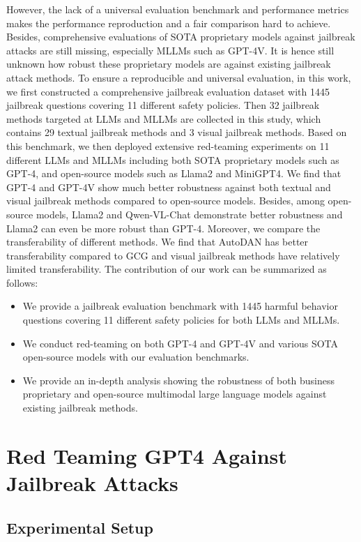 However, the lack of a universal evaluation benchmark and performance metrics makes the performance reproduction and a fair comparison hard to achieve. 
Besides, comprehensive evaluations of SOTA proprietary models against jailbreak attacks are still missing, especially MLLMs such as GPT-4V. 
It is hence still unknown how robust these proprietary models are against existing jailbreak attack methods. 
To ensure a reproducible and universal evaluation, in this work, we first constructed a comprehensive jailbreak evaluation dataset with 1445 jailbreak questions covering 11 different safety policies. Then 32 jailbreak methods targeted at LLMs and MLLMs are collected in this study, which contains 29 textual jailbreak methods and 3 visual jailbreak methods.
Based on this benchmark, we then deployed extensive red-teaming experiments on 11 different LLMs and MLLMs including both SOTA proprietary models such as GPT-4, and open-source models such as Llama2 and MiniGPT4. 
We find that GPT-4 and GPT-4V show much better robustness against both textual and visual jailbreak methods compared to open-source models. Besides, among open-source models, Llama2 and Qwen-VL-Chat demonstrate better robustness and Llama2 can even be more robust than GPT-4. Moreover, we compare the transferability of different methods. We find that AutoDAN has better transferability compared to GCG and visual jailbreak methods have relatively limited transferability. 
The contribution of our work can be summarized as follows: 
\begin{itemize}
    \item We provide a jailbreak evaluation benchmark with 1445 harmful behavior questions covering 11 different safety policies for both LLMs and MLLMs. 
    \item We conduct red-teaming on both GPT-4 and GPT-4V and various SOTA open-source models with our evaluation benchmarks.
    \item We provide an in-depth analysis showing the robustness of both business proprietary and open-source multimodal large language models against existing jailbreak methods. 
\end{itemize}

\section{Red Teaming GPT4 Against Jailbreak Attacks}
\subsection{Experimental Setup}

